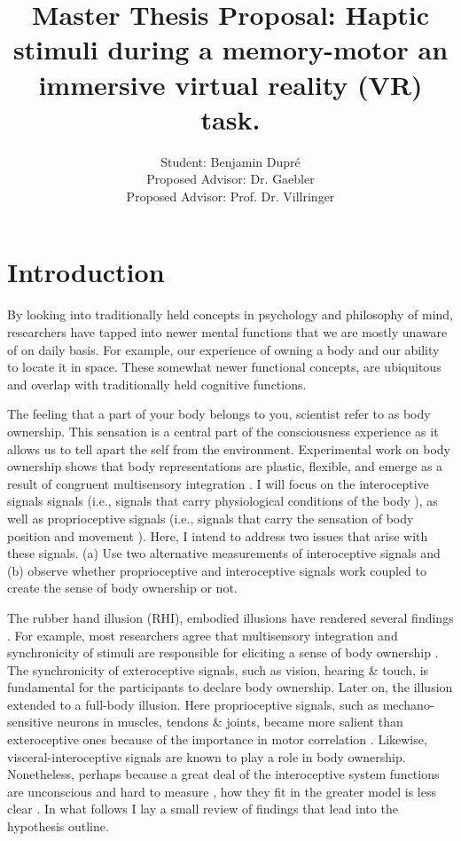 \documentclass{article}
\title{Master Thesis Proposal: Haptic stimuli during a memory-motor an immersive virtual reality (VR) task.}
\author{Student: Benjamin Dupré\\[1cm]{\small Proposed Advisor: Dr. Gaebler}\\[0cm]{\small Proposed Advisor: Prof. Dr. Villringer}}
\begin{document}
\maketitle


\tableofcontents

\section{Introduction}

By looking into traditionally held concepts in psychology and philosophy of mind, researchers have tapped into newer mental functions that we are mostly unaware of on daily basis. For example, our experience of owning a body and our ability to locate it in space. These somewhat newer functional concepts, are ubiquitous and overlap with traditionally held cognitive functions. 

 The feeling that a part of your body belongs to you, scientist refer to as body ownership. This sensation is a central part of the consciousness experience as it allows us to tell apart the self from the environment\cite{Tsakiris2007}. Experimental work on body ownership shows that body representations are plastic, flexible, and emerge as a result of congruent multisensory integration \cite{kilteni2015}. I will focus on the interoceptive signals signals (i.e., signals that carry physiological conditions of the body \cite{Ceunen2016OnTO}),  as well as proprioceptive signals (i.e., signals that carry the sensation of body position and movement \cite{TUTHILL2018R194}). Here, I intend to address two issues that arise with these signals. (a) Use two alternative measurements of interoceptive signals and (b) observe whether proprioceptive and interoceptive signals work coupled to create the sense of body ownership or not. 
 
  The rubber hand illusion (RHI), embodied illusions have rendered several findings \citep{kilteni2015}. For example, most researchers agree that multisensory integration and synchronicity of stimuli are responsible for eliciting a sense of body ownership \citep{Tsakiris2017}. The synchronicity of exteroceptive signals, such as vision, hearing \& touch, is fundamental for the participants to declare body ownership.  Later on, the illusion extended to a full-body illusion. Here proprioceptive signals, such as mechano-sensitive neurons in muscles, tendons \& joints, became more salient than exteroceptive ones because of the importance in motor correlation \citep{CHANCEL2021104722, Masseli2013}. Likewise, visceral-interoceptive signals are known to play a role in body ownership. Nonetheless, perhaps because a great deal of the interoceptive system functions are unconscious and hard to measure \citep{Brener2016}, how they fit in the greater model is less clear \citep{HORVATH2020361}. In what follows I lay a small review of findings that lead into the hypothesis outline. 
 
\end{document}
